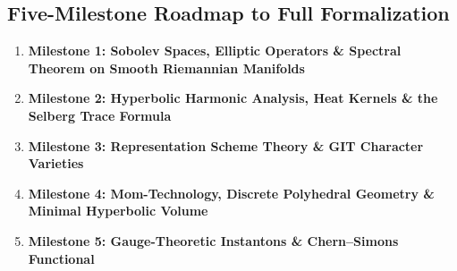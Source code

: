 \documentclass[11pt,a4paper]{article}
\begin{document}
\subsection{Five-Milestone Roadmap to Full Formalization}
\begin{enumerate}
\item \textbf{Milestone 1: Sobolev Spaces, Elliptic Operators \& Spectral Theorem on Smooth Riemannian Manifolds}
\item \textbf{Milestone 2: Hyperbolic Harmonic Analysis, Heat Kernels \& the Selberg Trace Formula}
\item \textbf{Milestone 3: Representation Scheme Theory \& GIT Character Varieties}
\item \textbf{Milestone 4: Mom-Technology, Discrete Polyhedral Geometry \& Minimal Hyperbolic Volume}
\item \textbf{Milestone 5: Gauge-Theoretic Instantons \& Chern--Simons Functional}
\end{enumerate}
\end{document}
